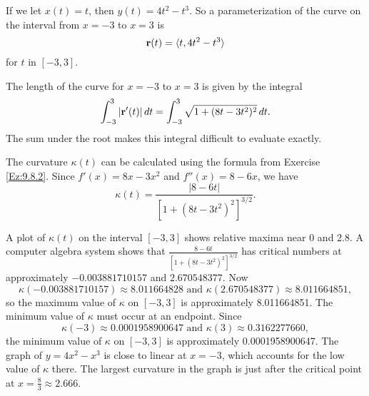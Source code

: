 \begin{exercises}
\begin{exerciseSolution}
    \ba
	    \item If we let $x(t) = t$, then $y(t) = 4t^2-t^3$. So a parameterization of the curve on the interval from $x =  -3$ to $x = 3$ is
\[\mathbf{r}(t) = \langle t, 4t^2-t^3 \rangle\]
for $t$ in $[-3,3]$. 
	    \item The length of the curve for $x =  -3$ to $x = 3$ is given by the integral
\[\int_{-3}^{3} |\mathbf{r}'(t)| \, dt = \int_{-3}^3 \sqrt{1+(8t-3t^2)^2} \, dt.\]
The sum under the root makes this integral difficult to evaluate exactly.
	    \item The curvature $\kappa(t)$ can be calculated using the formula from Exercise \ref{Ez:9.8.2}. Since $f'(x) = 8x - 3x^2$ and $f''(x) = 8-6x$, we have 
\[\kappa(t) = \frac{ \lvert 8-6t \rvert }{ \left[1+(8t-3t^2)^2\right]^{3/2} }.\]
	    \item A plot of $\kappa(t)$ on the interval $[-3,3]$ shows relative maxima near 0 and 2.8. A computer algebra system shows that $\frac{ 8-6t  }{ \left[1+(8t-3t^2)^2\right]^{3/2} }$ has critical numbers at approximately $-0.003881710157$ and $2.670548377$. Now 
\[\kappa(-0.003881710157) \approx  8.011664828 \text{ and } \kappa(2.670548377) \approx 8.011664851,\]
so the maximum value of $\kappa$ on $[-3,3]$ is approximately 8.011664851. The minimum value of $\kappa$ must occur at an endpoint. Since 
\[\kappa(-3) \approx 0.0001958900647 \text{ and } \kappa(3) \approx 0.3162277660,\]
the minimum value of $\kappa$ on $[-3,3]$ is approximately 0.0001958900647. The graph of $y=4x^2-x^3$ is close to linear at $x=-3$, which accounts for the low value of $\kappa$ there. The largest curvature in the graph is  just after the critical point at $x = \frac{8}{3} \approx 2.666$.  
    \ea
\end{exerciseSolution}



\end{exercises}
